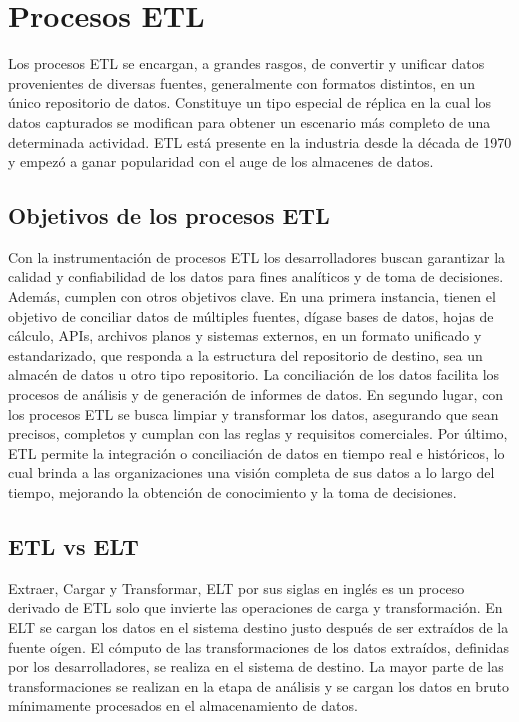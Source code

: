 \section{Procesos ETL}\label{section:etl}

Los procesos ETL se encargan, a grandes rasgos, de convertir y unificar datos provenientes de diversas fuentes, generalmente 
con formatos distintos, en un \'unico repositorio de datos. Constituye un tipo especial de r\'eplica en la cual los datos 
capturados se modifican para obtener un escenario m\'as completo de una determinada actividad. ETL est\'a presente en la 
industria desde la década de 1970 y empez\'o a ganar popularidad con el auge de los almacenes de datos\cite{etl_vs_elt_amazon}.

\subsection{Objetivos de los procesos ETL}

Con la instrumentaci\'on de procesos ETL los desarrolladores buscan garantizar la calidad y confiabilidad de los datos para 
fines anal\'iticos y de toma de decisiones. Adem\'as, cumplen con otros objetivos clave. En una primera instancia, 
tienen el objetivo de conciliar datos de m\'ultiples fuentes, d\'igase bases de datos, hojas de c\'alculo, APIs, 
archivos planos y sistemas externos, en un formato unificado y estandarizado, que responda a la estructura del repositorio de destino,
sea un almac\'en de datos u otro tipo repositorio. 
La conciliación de los datos facilita 
los procesos de an\'alisis y de generación de informes de datos. En segundo lugar, con los procesos ETL se busca 
limpiar y transformar los datos, asegurando que sean precisos, completos y cumplan con las reglas y requisitos comerciales. 
Por \'ultimo, ETL permite la integración o conciliación de datos en tiempo real e históricos, lo cual brinda a las organizaciones una visión 
completa de sus datos a lo largo del tiempo, mejorando la obtenci\'on de conocimiento y la toma de decisiones.

\subsection{ETL vs ELT}

Extraer, Cargar y Transformar, ELT por sus siglas en ingl\'es es un proceso derivado de ETL solo que invierte las operaciones 
de carga y transformación. En ELT se cargan los datos en el sistema destino justo despu\'es de ser extra\'idos de la fuente 
o\'igen. El cómputo de las transformaciones de los datos extraídos, definidas por los desarrolladores, se realiza en el sistema de destino. 
La mayor parte de las 
transformaciones se realizan en la etapa de análisis y se cargan los datos en bruto mínimamente procesados en el 
almacenamiento de datos.

